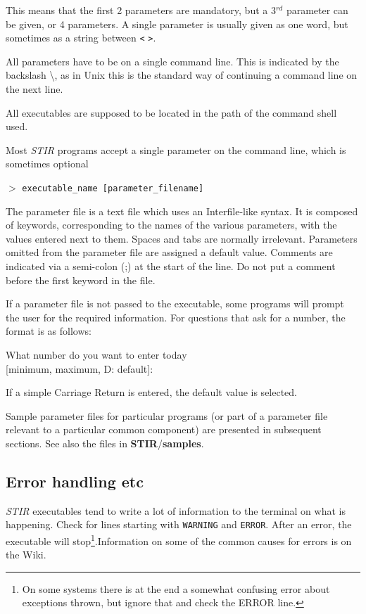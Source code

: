 \documentclass{article}
\newcommand{\tab}{\hspace{5mm}}
\newcommand{\cmdline}[1]{\par \noindent $>$ \texttt{#1}\par}
\begin{document}
This means that the first 2 parameters are mandatory, but a 3$^{rd}$ 
parameter can be given, or 4 parameters. A single parameter is 
usually given as one word, but sometimes as a string between 
\texttt{<} \texttt{>}. 


All parameters have to be on a single command line. This is indicated 
by the backslash {\textbackslash}, as in Unix this is the standard way 
of continuing a command line on the next line.


All executables are supposed to be located in the path of the 
command shell used.


Most \textit{STIR} programs accept a single parameter on the command 
line, which is sometimes optional

\cmdline{executable\_name [parameter\_filename]}


The parameter file is a text file which uses an Interfile-like 
syntax. It is composed of keywords, corresponding to the names 
of the various parameters, with the values entered next to them. 
Spaces and tabs are normally irrelevant. Parameters omitted from 
the parameter file are assigned a default value. 
Comments are indicated via a semi-colon (;) at the start of the line. Do
not put a comment before the first keyword in the file.

If a parameter file is not passed to the executable, some
programs will prompt the user 
for the required information. For questions that 
ask for a number, the format is as follows:


\tab What number do you want to enter today \\
\tab [minimum, maximum, D: default]:


If a simple Carriage Return is entered, the default value is 
selected.


Sample parameter files for particular programs (or part of a 
parameter file relevant to a particular common component) are 
presented in subsequent sections. See also the files in \textbf{STIR}/\textbf{samples}.


\subsection{
Error handling etc}
\textit{STIR} executables tend to write a lot of information to the terminal on what is happening.
Check for lines starting with \texttt{WARNING} and \texttt{ERROR}. 
After an error, the executable will stop\footnote{On some systems there is at the end
a somewhat confusing error about
exceptions thrown, but ignore that and check the ERROR line.}.Information on some of the common
causes for errors is on the Wiki.
\end{document}
